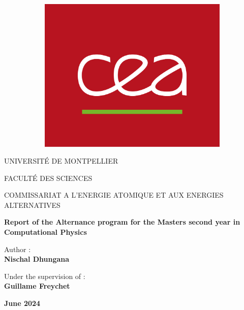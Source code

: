 \begin{figure}[ht]
\begin{subfigure}[b]{0.2\textwidth}
        \includegraphics[width=\textwidth]{images/Logo_cea.png}
    \end{subfigure}
\end{figure}


\begin{center}
\vspace{1.2cm}
\LARGE{UNIVERSITÉ DE MONTPELLIER}
	
\vspace{0.8cm}
\LARGE{FACULTÉ DES SCIENCES}

\vspace{0.8cm}
\LARGE{ COMMISSARIAT A L'ENERGIE ATOMIQUE ET AUX ENERGIES ALTERNATIVES}
	
\vspace{1.7cm}	
\Large
\textbf{Report of the Alternance program for the Masters second year in Computational Physics}

\vspace{1.3cm}
\normalsize	{Author :}\\
\vspace{.3cm}
\large{\textbf{Nischal Dhungana}}
	
\vspace{1.3cm}
\normalsize	{Under the supervision of :} \\
\vspace{.3cm}
\large
\textbf{Guillame Freychet}

\vspace{1.3cm}
\textbf{June 2024}
\end{center}